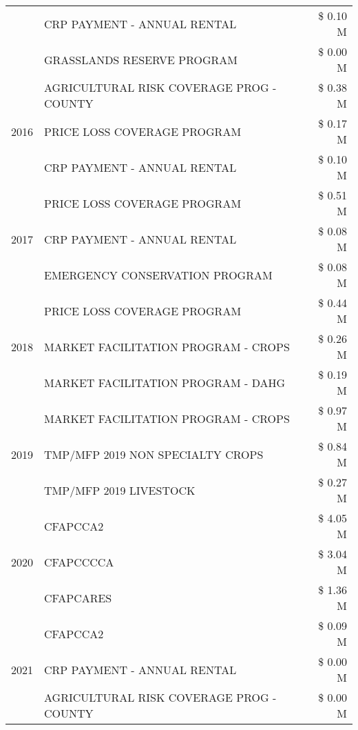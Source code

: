 \begin{tabular}{llr}
 & CRP PAYMENT - ANNUAL RENTAL & \$ 0.10 M \\
 & GRASSLANDS RESERVE PROGRAM & \$ 0.00 M \\
\cline{1-3}
\multirow[t]{3}{*}{2016} & AGRICULTURAL RISK COVERAGE PROG - COUNTY & \$ 0.38 M \\
 & PRICE LOSS COVERAGE PROGRAM & \$ 0.17 M \\
 & CRP PAYMENT - ANNUAL RENTAL & \$ 0.10 M \\
\cline{1-3}
\multirow[t]{3}{*}{2017} & PRICE LOSS COVERAGE PROGRAM & \$ 0.51 M \\
 & CRP PAYMENT - ANNUAL RENTAL & \$ 0.08 M \\
 & EMERGENCY CONSERVATION PROGRAM & \$ 0.08 M \\
\cline{1-3}
\multirow[t]{3}{*}{2018} & PRICE LOSS COVERAGE PROGRAM & \$ 0.44 M \\
 & MARKET FACILITATION PROGRAM - CROPS & \$ 0.26 M \\
 & MARKET FACILITATION PROGRAM - DAHG & \$ 0.19 M \\
\cline{1-3}
\multirow[t]{3}{*}{2019} & MARKET FACILITATION PROGRAM - CROPS & \$ 0.97 M \\
 & TMP/MFP 2019 NON SPECIALTY CROPS & \$ 0.84 M \\
 & TMP/MFP 2019 LIVESTOCK & \$ 0.27 M \\
\cline{1-3}
\multirow[t]{3}{*}{2020} & CFAPCCA2 & \$ 4.05 M \\
 & CFAPCCCCA & \$ 3.04 M \\
 & CFAPCARES & \$ 1.36 M \\
\cline{1-3}
\multirow[t]{3}{*}{2021} & CFAPCCA2 & \$ 0.09 M \\
 & CRP PAYMENT - ANNUAL RENTAL & \$ 0.00 M \\
 & AGRICULTURAL RISK COVERAGE PROG - COUNTY & \$ 0.00 M \\
\cline{1-3}
\bottomrule
\end{tabular}
